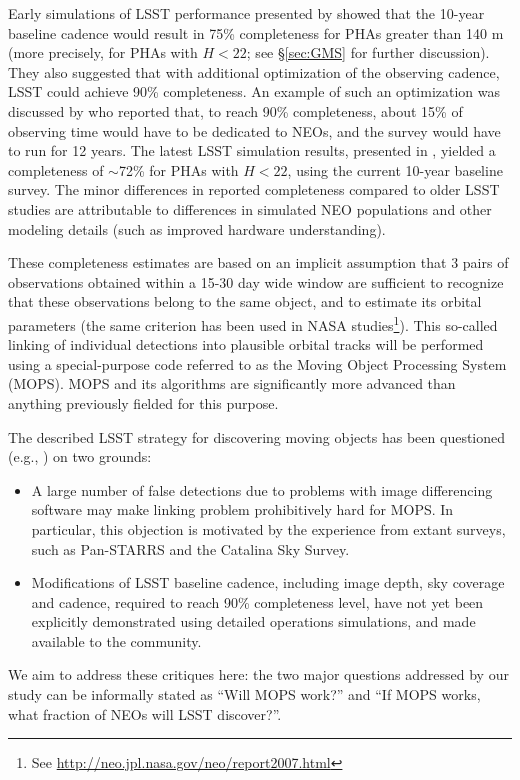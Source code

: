Early simulations of LSST performance presented by \cite{IvezicNEO2007} showed that the 10-year baseline
cadence would result in 75\% completeness for PHAs greater than 140 m (more  precisely, for PHAs with
$H<22$; see \S\ref{sec:GMS} for further discussion). They also suggested that with additional optimization of the
observing cadence, LSST could achieve 90\% completeness. An example of such an optimization was discussed
by \cite{LSSToverview} who reported that, to reach 90\% completeness, about 15\% of observing time would
have to be dedicated to NEOs, and the survey would have to run for 12 years.
The latest LSST simulation results, presented in \cite{JJI2016}, yielded a completeness of $\sim$72\% for
PHAs with $H<22$, using the current 10-year baseline survey. The minor differences in reported completeness
compared to older LSST studies are attributable to differences in simulated NEO populations and other modeling
details (such as improved hardware understanding).

These completeness estimates are based on an implicit assumption that 3 pairs of observations
obtained within a 15-30 day wide window are sufficient to recognize that these observations belong
to the same object, and to estimate its orbital parameters (the same criterion has been used in NASA
studies\footnote{See \url{http://neo.jpl.nasa.gov/neo/report2007.html}}).
This so-called linking of individual detections into plausible orbital tracks
will be performed using a special-purpose code referred to as the Moving Object
Processing System (MOPS). MOPS and its algorithms are significantly more
advanced than anything previously fielded for this purpose.

The described LSST strategy for discovering moving objects has been questioned (e.g., \citealt{GMS2016}) on
two grounds:
\begin{itemize}
\item A large number of false detections due to problems with image differencing software may
make linking problem prohibitively hard for MOPS. In particular, this objection is motivated by the experience
from extant surveys, such as Pan-STARRS and the Catalina Sky Survey.
\item Modifications of LSST baseline cadence, including image depth, sky coverage and cadence,
required to reach 90\% completeness level, have not yet been explicitly demonstrated using detailed
operations simulations, and made available to the community.
\end{itemize}
We aim to address these critiques here: the two major questions addressed by our study can be informally
stated as ``Will MOPS work?'' and ``If MOPS works, what fraction of  NEOs will LSST discover?''.

